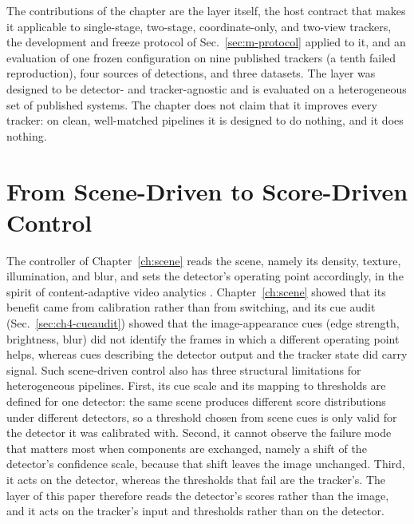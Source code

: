 The contributions of the chapter are the layer itself, the host contract that makes it applicable to single-stage, two-stage, coordinate-only, and two-view trackers, the development and freeze protocol of Sec.~\ref{sec:m-protocol} applied to it, and an evaluation of one frozen configuration on nine published trackers (a tenth failed reproduction), four sources of detections, and three datasets. The layer was designed to be detector- and tracker-agnostic and is evaluated on a heterogeneous set of published systems. The chapter does not claim that it improves every tracker: on clean, well-matched pipelines it is designed to do nothing, and it does nothing.

\section{From Scene-Driven to Score-Driven Control}\label{sec:ch5-scene}
The controller of Chapter~\ref{ch:scene} reads the scene, namely its density, texture, illumination, and blur, and sets the detector's operating point accordingly, in the spirit of content-adaptive video analytics \cite{jiang2018chameleon}. Chapter~\ref{ch:scene} showed that its benefit came from calibration rather than from switching, and its cue audit (Sec.~\ref{sec:ch4-cueaudit}) showed that the image-appearance cues (edge strength, brightness, blur) did not identify the frames in which a different operating point helps, whereas cues describing the detector output and the tracker state did carry signal. Such scene-driven control also has three structural limitations for heterogeneous pipelines. First, its cue scale and its mapping to thresholds are defined for one detector: the same scene produces different score distributions under different detectors, so a threshold chosen from scene cues is only valid for the detector it was calibrated with. Second, it cannot observe the failure mode that matters most when components are exchanged, namely a shift of the detector's confidence scale, because that shift leaves the image unchanged. Third, it acts on the detector, whereas the thresholds that fail are the tracker's. The layer of this paper therefore reads the detector's scores rather than the image, and it acts on the tracker's input and thresholds rather than on the detector.

